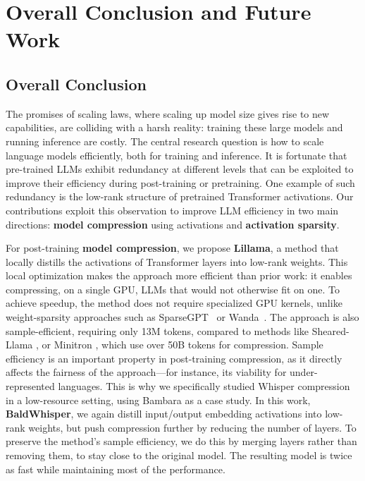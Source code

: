 \chapter{Overall Conclusion and Future Work}

\section{Overall Conclusion}
The promises of scaling laws, where scaling up model size gives rise to new capabilities, 
are colliding with a harsh reality: training these large models and running inference
are costly. The central research question is how to scale language models efficiently,
both for training and inference. It is fortunate that pre-trained LLMs exhibit
redundancy at different levels that can be exploited to improve their efficiency
during post-training or pretraining. One example of
such redundancy is the low-rank structure of pretrained Transformer activations.
Our contributions exploit this observation to improve LLM efficiency in two main
directions: \textbf{model compression} using activations and \textbf{activation sparsity}.

For post-training \textbf{model compression}, we propose \textbf{Lillama}, a method that locally distills the
activations of Transformer layers into low-rank weights. This local optimization makes
the approach more efficient than prior work: it enables compressing, on a single GPU,
LLMs that would not otherwise fit on one. To achieve speedup, the method does not require
specialized GPU kernels, unlike weight-sparsity approaches such as SparseGPT~\citep{frantar2023sparsegpt} or Wanda~\citep{sun2024wanda}.
The approach is also sample-efficient, requiring only 13M tokens, compared to methods
like Sheared-Llama \citep{xia2024sheared}, or Minitron \citep{muralidharan2024compact,
sreenivas2024minitron}, which use over 50B tokens for compression. Sample efficiency is an important property in post-training compression, as it
directly affects the fairness of the approach---for instance, its viability for
under-represented languages. This is why we specifically studied Whisper compression in
a low-resource setting, using Bambara as a case study. In this work, \textbf{BaldWhisper}, we
again distill input/output embedding activations into low-rank weights, but push
compression further by reducing the number of layers. To preserve the method's sample
efficiency, we do this by merging layers rather than removing them,
to stay close to the original model.
The resulting model is twice as fast while maintaining most of the performance.

